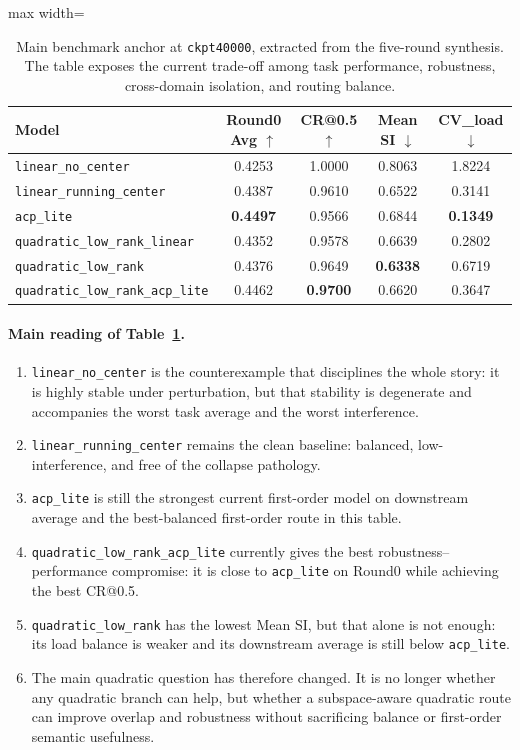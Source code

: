 \documentclass[11pt]{article}
\newcommand{\tablesize}{\footnotesize}
\begin{document}
\begin{table}[H]
\centering
\tablesize
\begin{adjustbox}{max width=\linewidth}
\begin{tabular}{lcccc}
\toprule
Model & Round0 Avg $\uparrow$ & CR@0.5 $\uparrow$ & Mean SI $\downarrow$ & CV\_load $\downarrow$ \\
\midrule
\texttt{linear\_no\_center} & 0.4253 & 1.0000 & 0.8063 & 1.8224 \\
\texttt{linear\_running\_center} & 0.4387 & 0.9610 & 0.6522 & 0.3141 \\
\texttt{acp\_lite} & \textbf{0.4497} & 0.9566 & 0.6844 & \textbf{0.1349} \\
\texttt{quadratic\_low\_rank\_linear} & 0.4352 & 0.9578 & 0.6639 & 0.2802 \\
\texttt{quadratic\_low\_rank} & 0.4376 & 0.9649 & \textbf{0.6338} & 0.6719 \\
\texttt{quadratic\_low\_rank\_acp\_lite} & 0.4462 & \textbf{0.9700} & 0.6620 & 0.3647 \\
\bottomrule
\end{tabular}
\end{adjustbox}
\caption{Main benchmark anchor at \texttt{ckpt40000}, extracted from the five-round synthesis. The table exposes the current trade-off among task performance, robustness, cross-domain isolation, and routing balance.}
\label{tab:benchmark-40000}
\end{table}

\paragraph{Main reading of Table~\ref{tab:benchmark-40000}.}
\begin{enumerate}
    \item \texttt{linear\_no\_center} is the counterexample that disciplines the whole story: it is highly stable under perturbation, but that stability is degenerate and accompanies the worst task average and the worst interference.
    \item \texttt{linear\_running\_center} remains the clean baseline: balanced, low-interference, and free of the collapse pathology.
    \item \texttt{acp\_lite} is still the strongest current first-order model on downstream average and the best-balanced first-order route in this table.
    \item \texttt{quadratic\_low\_rank\_acp\_lite} currently gives the best robustness--performance compromise: it is close to \texttt{acp\_lite} on Round0 while achieving the best CR@0.5.
    \item \texttt{quadratic\_low\_rank} has the lowest Mean SI, but that alone is not enough: its load balance is weaker and its downstream average is still below \texttt{acp\_lite}.
    \item The main quadratic question has therefore changed. It is no longer whether any quadratic branch can help, but whether a subspace-aware quadratic route can improve overlap and robustness without sacrificing balance or first-order semantic usefulness.
\end{enumerate}
\end{document}
